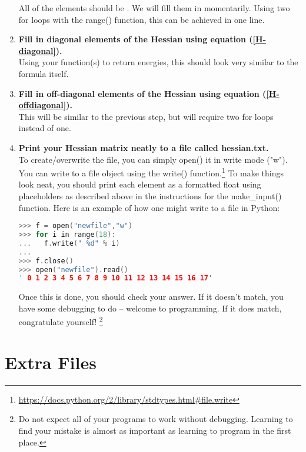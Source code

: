 \documentclass[11pt]{article}
\newcommand{\ttf}[1]{{\ttfamily #1}}
\begin{document}
\begin{enumerate}[label=\textbf{\arabic*}]
All of the elements should be \ttf{0.0}.  We will fill them in momentarily.
Using two \ttf{for} loops with the \ttf{range()} function, this can be achieved in one line.
\item {\bf Fill in diagonal elements of the Hessian using equation (\ref{H-diagonal}).}\\
Using your function(s) to return energies, this should look very similar to the formula itself.
\item {\bf Fill in off-diagonal elements of the Hessian using equation (\ref{H-offdiagonal}).}\\
This will be similar to the previous step, but will require two \ttf{for} loops instead of one.
\item {\bf Print your Hessian matrix neatly to a file called \ttf{hessian.txt}.}\\
To create/overwrite the file, you can simply \ttf{open()} it in write mode (\ttf{"w"}).
You can write to a file object using the \ttf{write()} function.\footnote{\url{https://docs.python.org/2/library/stdtypes.html\#file.write}}
To make things look neat, you should print each element as a formatted \ttf{float} using placeholders as described above in the instructions for the \ttf{make\_input()} function.
Here is an example of how one might write to a file in Python:
\begin{addmargin}{2cm}{}
\begin{lstlisting}[language=c++]
>>> f = open("newfile","w")
>>> for i in range(18):
...   f.write(" %d" % i)
... 
>>> f.close()
>>> open("newfile").read()
' 0 1 2 3 4 5 6 7 8 9 10 11 12 13 14 15 16 17'
\end{lstlisting}
\end{addmargin}
Once this is done, you should check your answer.
If it doesn't match, you have some debugging to do -- welcome to programming.
If it does match, congratulate yourself! \footnote{Do not expect all of your programs to work without debugging.  Learning to find your mistake is almost as important as learning to program in the first place.}
\end{enumerate}


\newpage
\section{Extra Files}
\end{document}
